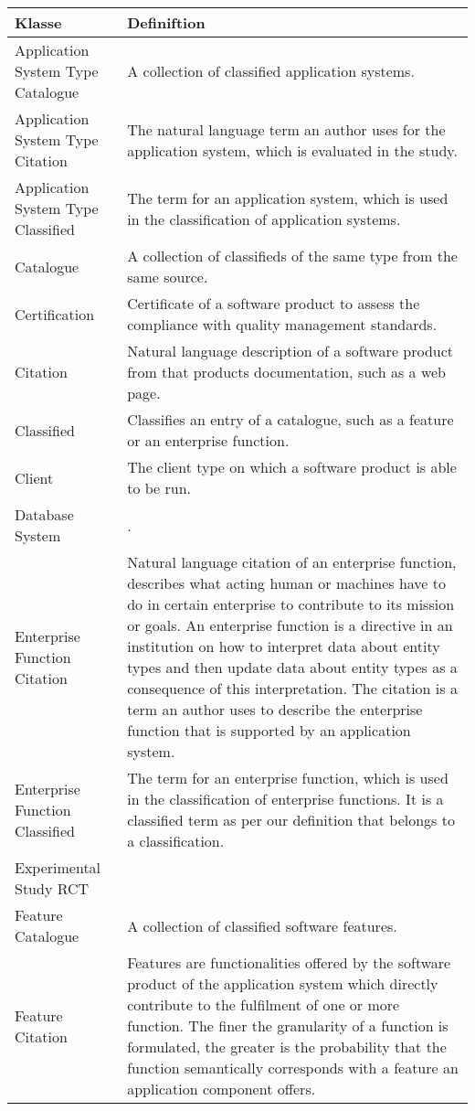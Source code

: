 \begin{longtable}{ | p{4 cm} | p{7 cm} | }
\hline
\textbf{Klasse} & \textbf{Definiftion} \\ \hline
\endhead
Application System Type Catalogue & A collection of classified application systems. \\
\hline
Application System Type Citation & The natural language term an author uses for the application system, which is evaluated in the study. \\
\hline
Application System Type Classified & The term for an application system, which is used in the classification of application systems. \\
\hline
Catalogue & A collection of classifieds of the same type from the same source. \\
\hline
Certification & Certificate of a software product to assess the compliance with quality management standards. \\
\hline
Citation & Natural language description of a software product from that products documentation, such as a web page. \\
\hline
Classified & Classifies an entry of a catalogue, such as a feature or an enterprise function. \\
\hline
Client & The client type on which a software product is able to be run. \\
\hline
Database System &. \\
\hline
Enterprise Function Citation & Natural language citation of an enterprise function, describes what acting human or machines have to do in certain enterprise to contribute to its mission or goals. An enterprise function is a directive in an institution on how to interpret data about entity types and then update data about entity types as a consequence of this interpretation. The citation is a term an author uses to describe the enterprise function that is supported by an application system. \\
\hline
Enterprise Function Classified & The term for an enterprise function, which is used in the classification of enterprise functions. It is a classified term as per our definition that belongs to a classification. \\
\hline
Experimental Study RCT &  \\
\hline
Feature Catalogue & A collection of classified software features. \\
\hline
Feature Citation & Features are functionalities offered by the software product of the application system which directly contribute to the fulfilment of one or more function. The finer the granularity of a function is formulated, the greater is the probability that the function semantically corresponds with a feature an application component offers. \\

\end{longtable}
